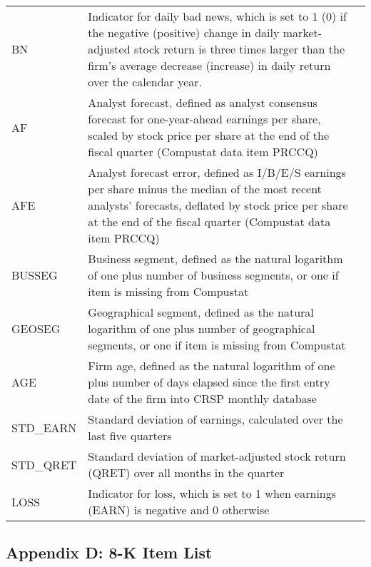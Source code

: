 \begin{table}[H]
\begin{tabular}{lp{15cm}p{15cm}}
		BN & Indicator for daily bad news, which is set to 1 (0) if the negative (positive) change in daily market-adjusted stock return is three times larger than the firm’s average decrease (increase) in daily return over the calendar year.\\
		AF & Analyst forecast, defined as analyst consensus forecast for one-year-ahead earnings per share, scaled by stock price per share at the end of the fiscal quarter (Compustat data item PRCCQ)\\
		AFE & Analyst forecast error, defined as I/B/E/S earnings per share minus the median of the most recent analysts' forecasts, deflated by stock price per share at the end of the fiscal quarter (Compustat data item PRCCQ)\\
		BUSSEG & Business segment, defined as the natural logarithm of one plus number of business segments, or one if item is missing from Compustat\\
		GEOSEG & Geographical segment, defined as the natural logarithm of one plus number of geographical segments, or one if item is missing from Compustat\\
		AGE & Firm age, defined as the natural logarithm of one plus number of days elapsed since the first entry date of the firm into CRSP monthly database\\
		STD\_EARN & Standard deviation of earnings, calculated over the last five quarters\\
		STD\_QRET & Standard deviation of market-adjusted stock return (QRET) over all months in the quarter\\
		LOSS & Indicator for loss, which is set to 1 when earnings (EARN) is negative and 0 otherwise\\
	\end{tabular}%
\end{table}%
\newpage
\subsection*{Appendix D: 8-K Item List}
\label{appd}
